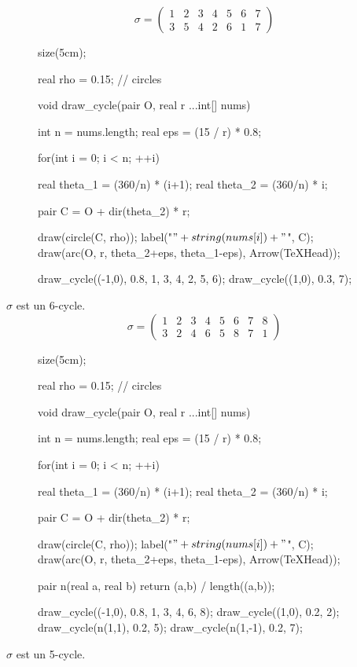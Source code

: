 \begin{exm}
	\[
		\sigma = \begin{pmatrix}
			1&2&3&4&5&6&7\\
			3&5&4&2&6&1&7
		\end{pmatrix} 
	\]

	\begin{figure}[H]
		\centering

		\begin{asy}
			size(5cm);

			real rho = 0.15; // circles

			void draw_cycle(pair O, real r ...int[] nums) {
				int n = nums.length;
				real eps = (15 / r) * 0.8;

				for(int i = 0; i < n; ++i) {
					real theta_1 = (360/n) * (i+1);
					real theta_2 = (360/n) * i;

					pair C = O + dir(theta_2) * r;

					draw(circle(C, rho));
					label("$" + string(nums[i]) + "$", C);
					draw(arc(O, r, theta_2+eps, theta_1-eps), Arrow(TeXHead));
				}
			}

			draw_cycle((-1,0), 0.8, 1, 3, 4, 2, 5, 6);
			draw_cycle((1,0), 0.3, 7);
		\end{asy}
	\end{figure}

	$\sigma$ est un 6-cycle.
	\vspace{3mm}
	\[
		\sigma = \begin{pmatrix}
			1&2&3&4&5&6&7&8\\
			3&2&4&6&5&8&7&1
		\end{pmatrix} 
	\]

	\begin{figure}[H]
		\centering

		\begin{asy}
			size(5cm);

			real rho = 0.15; // circles

			void draw_cycle(pair O, real r ...int[] nums) {
				int n = nums.length;
				real eps = (15 / r) * 0.8;

				for(int i = 0; i < n; ++i) {
					real theta_1 = (360/n) * (i+1);
					real theta_2 = (360/n) * i;

					pair C = O + dir(theta_2) * r;

					draw(circle(C, rho));
					label("$" + string(nums[i]) + "$", C);
					draw(arc(O, r, theta_2+eps, theta_1-eps), Arrow(TeXHead));
				}
			}

			pair n(real a, real b) { return (a,b) / length((a,b)); }

			draw_cycle((-1,0), 0.8, 1, 3, 4, 6, 8);
			draw_cycle((1,0), 0.2, 2);
			draw_cycle(n(1,1), 0.2, 5);
			draw_cycle(n(1,-1), 0.2, 7);
		\end{asy}
	\end{figure}

	$\sigma$ est un 5-cycle.
\end{exm}

